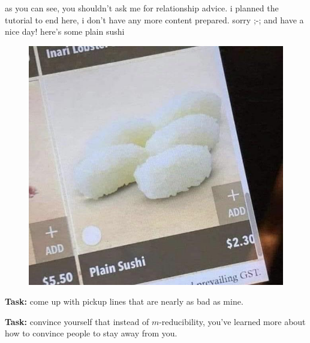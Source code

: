 \documentclass{beamer}
\begin{document}
\begin{frame}{as you can see, you shouldn't ask me for relationship advice.}
i planned the tutorial to end here, i don't have any more content prepared. sorry ;-; and have a nice day! here's some plain sushi

\begin{figure}[h]
\centering
\includegraphics[scale=0.2]{img/plain_sushi.jpg}
\end{figure}

\vspace{4mm}

{\color{red} \textbf{Task:} come up with pickup lines that are nearly as bad as mine.}

\vspace{2mm}

{\color{red} \textbf{Task:} convince yourself that instead of $m$-reducibility, you've learned more about how to convince people to stay away from you.}

\end{frame}
\end{document}
